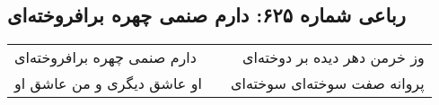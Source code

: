 \begin{center}
\section*{رباعی شماره ۶۲۵: دارم صنمی چهره برافروخته‌ای}
\label{sec:sh625}
\begin{longtable}{l p{0.5cm} r}
دارم صنمی چهره برافروخته‌ای
&&
وز خرمن دهر دیده بر دوخته‌ای
\\
او عاشق دیگری و من عاشق او
&&
پروانه صفت سوخته‌ای سوخته‌ای
\\
\end{longtable}
\end{center}
